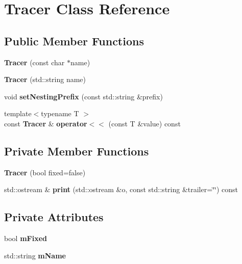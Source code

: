 \section{Tracer Class Reference}
\label{class_tracer}
\subsection*{Public Member Functions}
\begin{DoxyCompactItemize}
\item 
{\bfseries Tracer} (const char $\ast$name)\label{class_tracer_ab5f76eb2148eb92a6da5d72c61cb5005}

\item 
{\bfseries Tracer} (std\+::string name)\label{class_tracer_a4f325d324556b69e2897d0b137b70e99}

\item 
void {\bfseries set\+Nesting\+Prefix} (const std\+::string \&prefix)\label{class_tracer_a83ec129e27aed135efaeb395f9984641}

\item 
{\footnotesize template$<$typename T $>$ }\\const {\bf Tracer} \& {\bfseries operator$<$$<$} (const T \&value) const \label{class_tracer_ad94e93b9f930cd450c4f6bb0165de306}

\end{DoxyCompactItemize}
\subsection*{Private Member Functions}
\begin{DoxyCompactItemize}
\item 
{\bfseries Tracer} (bool fixed=false)\label{class_tracer_afbefbddc0054afb2eb47192fb70385db}

\item 
std\+::ostream \& {\bfseries print} (std\+::ostream \&o, const std\+::string \&trailer=\char`\"{}\char`\"{}) const \label{class_tracer_abc4ecdc888dc5341cafc745f7e7e56ea}

\end{DoxyCompactItemize}
\subsection*{Private Attributes}
\begin{DoxyCompactItemize}
\item 
bool {\bfseries m\+Fixed}\label{class_tracer_a82128eaf4e4d4a4c71a0e19092fb9760}

\item 
std\+::string {\bfseries m\+Name}\label{class_tracer_a6abef65821def1e4151f64a72cc975c3}

\end{DoxyCompactItemize}
